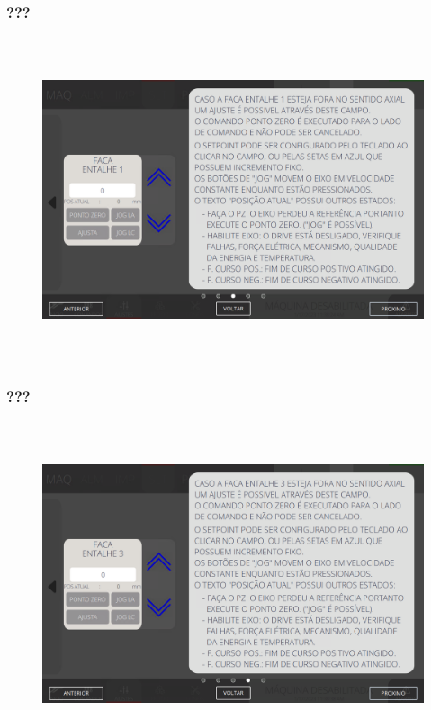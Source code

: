 \newpage
\thispagestyle{fancy}
\vspace*{\fill}
\subsubsection{\small{???}}
\begin{figure}[h]
  \centering
  \includegraphics[width=576px,height=360px]{src/imagesFlexo/05-slotter/settings/e-9.png}
   \label{}
\end{figure}
\vspace*{\fill}

\newpage
\thispagestyle{fancy}
\vspace*{\fill}
\subsubsection{\small{???}}
\begin{figure}[h]
  \centering
  \includegraphics[width=576px,height=360px]{src/imagesFlexo/05-slotter/settings/e-10.png}
   \label{}
\end{figure}
\vspace*{\fill}

